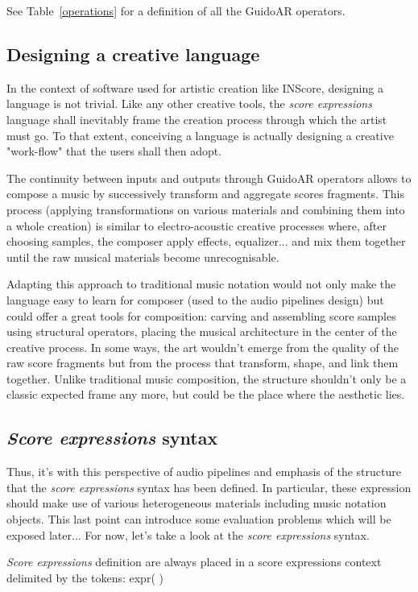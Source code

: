 \documentclass{article}
\newenvironment{INScode}		{\vspace{-2mm}\small\verbatim}{\endverbatim\vspace{-2mm}}
\newcommand{\sExpr}{\emph{score expressions} }
\newcommand{\SExpr}{\emph{Score expressions} }
\begin{document}
See Table~\ref{operations} for a definition of all the GuidoAR operators.

\subsection{Designing a creative language}
In the context of software used for artistic creation like INScore, designing a language is not trivial. Like any other creative tools,  the \sExpr language shall inevitably frame the creation process through which the artist must go. To that extent, conceiving a language is actually designing a creative "work-flow" that the users shall then adopt.

The continuity between inputs and outputs through GuidoAR operators allows to compose a music by successively transform and aggregate scores fragments. This process (applying transformations on various materials and combining them into a whole creation) is similar to electro-acoustic creative processes where, after choosing samples, the composer apply effects, equalizer... and mix them together until the raw musical materials become unrecognisable.

Adapting this approach to traditional music notation would not only make the language easy to learn for composer (used to the audio pipelines design) but could offer a great tools for composition: carving and assembling score samples using structural operators, placing the musical architecture in the center of the creative process. In some ways, the art wouldn't emerge from the quality of the raw score fragments but from the process that transform, shape, and link them together. Unlike traditional music composition, the structure shouldn't only be a classic expected frame any more, but could be the place where the aesthetic lies.

\subsection{\SExpr syntax}

Thus, it's with this perspective of audio pipelines and emphasis of the structure that the \sExpr syntax has been defined. In particular, these expression should make use of various heterogeneous materials including music notation objects. This last point can introduce some evaluation problems which will be exposed later... For now, let's take a look at the \sExpr syntax.

\smallbreak
\SExpr definition are always placed in a score expressions context delimited by the tokens:
\begin{INScode}
expr(      )
\end{INScode}
\end{document}
